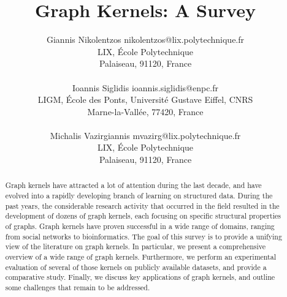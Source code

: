\documentclass[twoside,11pt]{article}
\begin{document}
\title{Graph Kernels: A Survey}

\author{\name Giannis Nikolentzos \email nikolentzos@lix.polytechnique.fr \\
		\addr LIX, \'Ecole Polytechnique\\
       	Palaiseau, 91120, France\\ \\
       \name Ioannis Siglidis \email ioannis.siglidis@enpc.fr \\
       \addr LIGM, \'Ecole des Ponts, Universit\'e Gustave Eiffel, CNRS \\
       Marne-la-Vall\'ee, 77420, France\\ \\
       \name Michalis Vazirgiannis \email mvazirg@lix.polytechnique.fr \\
       \addr LIX, \'Ecole Polytechnique\\
       Palaiseau, 91120, France}



\maketitle


\begin{abstract}
Graph kernels have attracted a lot of attention during the last decade, and have evolved into a rapidly developing branch of learning on structured data.
During the past  years, the considerable research activity that occurred in the field resulted in the development of dozens of graph kernels, each focusing on specific structural properties of graphs.
Graph kernels have proven successful in a wide range of domains, ranging from social networks to bioinformatics.
The goal of this survey is to provide a unifying view of the literature on graph kernels.
In particular, we present a comprehensive overview of a wide range of graph kernels.
Furthermore, we perform an experimental evaluation of several of those kernels on publicly available datasets, and provide a comparative study.
Finally, we discuss key applications of graph kernels, and outline some challenges that remain to be addressed. 
\end{abstract}
\end{document}
